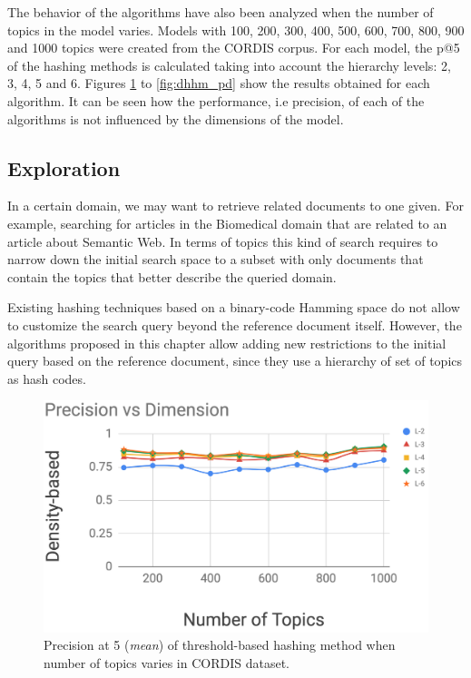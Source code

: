The behavior of the algorithms have also been analyzed when the number of topics in the model varies. Models with 100, 200, 300, 400, 500, 600, 700, 800, 900 and 1000 topics were created from the CORDIS corpus. For each model, the p@5 of the hashing methods is calculated taking into account the hierarchy levels: 2, 3, 4, 5 and 6. Figures \ref{fig:thhm_pd} to \ref{fig:dhhm_pd} show the results obtained for each algorithm. It can be seen how the performance, i.e precision, of each of the algorithms is not influenced by the dimensions of the model.

\subsection{Exploration}
\label{sec:comparison-exploration}

In a certain domain, we may want to retrieve related documents to one given. For example, searching for articles in the Biomedical domain that are related to an article about Semantic Web. In terms of topics this kind of search requires to narrow down the initial search space to a subset with only documents that contain the topics that better describe the queried domain.

Existing hashing techniques based on a binary-code Hamming space do not allow to customize the search query beyond the reference document itself. However, the algorithms proposed in this chapter allow adding new restrictions to the initial query based on the reference document, since they use a hierarchy of set of topics as hash codes.

\begin{figure}[t]\centering
\includegraphics[scale=0.25]{dhhm-pd.png}
\caption{Precision at 5 (\textit{mean}) of threshold-based hashing method when number of topics varies in CORDIS dataset.}
\label{fig:thhm_pd}
\end{figure}

